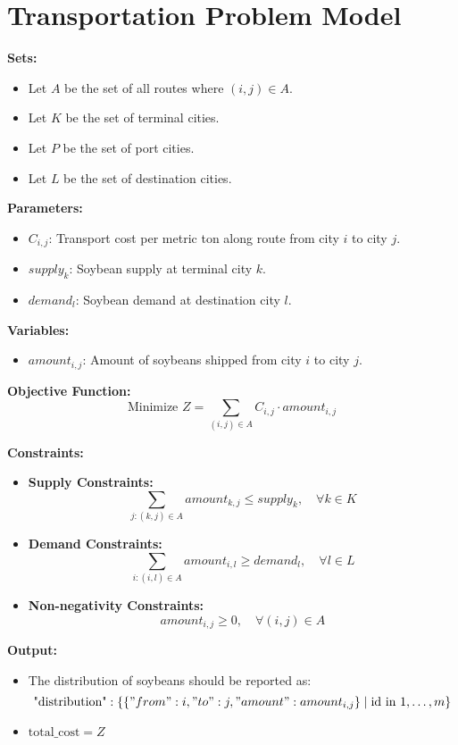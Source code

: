 \documentclass{article}
\begin{document}
\section*{Transportation Problem Model}

\textbf{Sets:}
\begin{itemize}
    \item Let \( A \) be the set of all routes where \( (i, j) \in A \).
    \item Let \( K \) be the set of terminal cities.
    \item Let \( P \) be the set of port cities.
    \item Let \( L \) be the set of destination cities.
\end{itemize}

\textbf{Parameters:}
\begin{itemize}
    \item \( C_{i,j} \): Transport cost per metric ton along route from city \( i \) to city \( j \).
    \item \( supply_k \): Soybean supply at terminal city \( k \).
    \item \( demand_l \): Soybean demand at destination city \( l \).
\end{itemize}

\textbf{Variables:}
\begin{itemize}
    \item \( amount_{i,j} \): Amount of soybeans shipped from city \( i \) to city \( j \).
\end{itemize}

\textbf{Objective Function:}
\[
\text{Minimize } Z = \sum_{(i,j) \in A} C_{i,j} \cdot amount_{i,j}
\]

\textbf{Constraints:}
\begin{itemize}

    \item \textbf{Supply Constraints:}
    \[
    \sum_{j: (k,j) \in A} amount_{k,j} \leq supply_k, \quad \forall k \in K
    \]

    \item \textbf{Demand Constraints:}
    \[
    \sum_{i: (i,l) \in A} amount_{i,l} \geq demand_l, \quad \forall l \in L
    \]

    \item \textbf{Non-negativity Constraints:}
    \[
    amount_{i,j} \geq 0, \quad \forall (i,j) \in A
    \]

\end{itemize}

\textbf{Output:}
\begin{itemize}
    \item The distribution of soybeans should be reported as:
    \[
    \text{"distribution"}: \left\{ \{ "from": i, "to": j, "amount": amount_{i,j} \} \mid \text{id in } 1, \ldots, m \right\}
    \]
    \item \(\text{total\_cost} = Z\)
\end{itemize}
\end{document}
